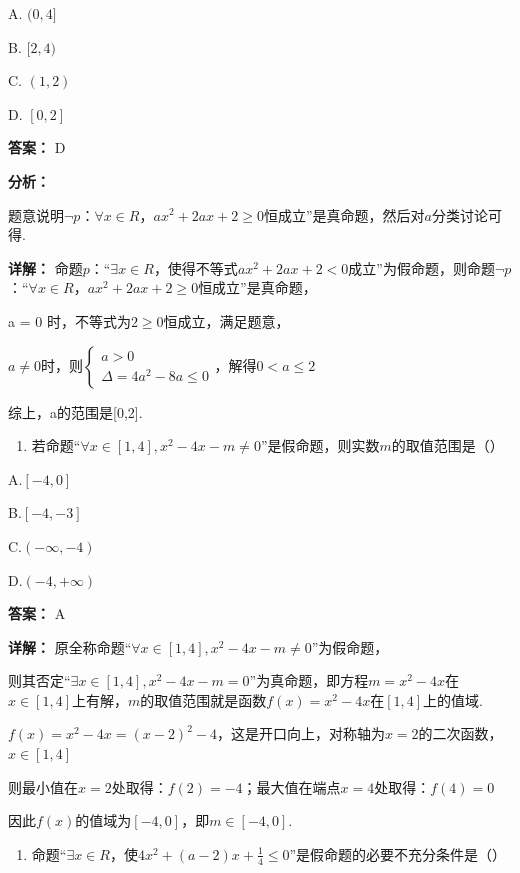 \documentclass[11pt,a4paper]{ctexart}
\begin{document}
A. $(0, 4]$

B. $[2, 4)$

C. $(1, 2)$

D. $[0, 2]$

\textbf{答案：}
D

\textbf{分析：}

题意说明\(\neg p\)：\(\forall x\in R\)，\(ax^{2} + 2ax + 2 \geq 0\)恒成立''是真命题，然后对\(a\)分类讨论可得.

\textbf{详解：}
命题\(p\)：``\(\exists x \in R\)，使得不等式\(ax^2 + 2ax + 2 < 0\)成立''为假命题，则命题\(\neg p\)：``\(\forall x \in R\)，\(ax^2 + 2ax + 2 \geq 0\)恒成立''是真命题，

a = 0 时，不等式为\(2 \geq 0\)恒成立，满足题意，

\(a \neq 0\)时，则\(\left\{ \begin{array}{l} a > 0 \\ \Delta = 4a^2 - 8a \leq 0 \end{array} \right.\)，解得\(0 < a \leq 2\)

综上，a的范围是{[}0,2{]}.

\begin{enumerate}[label=\arabic*., leftmargin=*, start=4]
\item 若命题``\(\forall x \in [1,4], x^2 - 4x - m \neq 0\)''是假命题，则实数\(m\)的取值范围是（）
\end{enumerate}

A.\([-4,0]\)

B.\([-4, -3]\)

C.\((- \infty, -4)\)

D.\((-4, +\infty)\)

\textbf{答案：}
A

\textbf{详解：}
原全称命题``\(\forall x \in [1,4], x^{2} - 4x - m \neq 0\)''为假命题，

则其否定``\(\exists x \in [1,4], x^2 - 4x - m = 0\)''为真命题，即方程\(m = x^2 - 4x\)在\(x \in [1,4]\)上有解，\(m\)的取值范围就是函数\(f(x) = x^2 - 4x\)在\([1,4]\)上的值域.

\(f(x) = x^{2} - 4x = (x - 2)^{2} - 4\)，这是开口向上，对称轴为\(x = 2\)的二次函数，\(x\in [1,4]\)

则最小值在\(x = 2\)处取得：\(f(2) = -4\)；最大值在端点\(x = 4\)处取得：\(f(4) = 0\)

因此\(f(x)\)的值域为\([-4,0]\)，即\(m \in [-4,0]\).

\begin{enumerate}[label=\arabic*., leftmargin=*, start=5]
\item 命题``\(\exists x \in R\)，使\(4x^{2} + (a - 2)x + \frac{1}{4} \leq 0\)''是假命题的必要不充分条件是（）
\end{enumerate}
\end{document}
